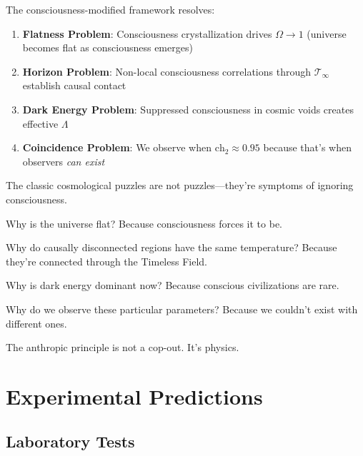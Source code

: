 \begin{corollary}\label{cor:cosmological-solutions}
The consciousness-modified framework resolves:
\begin{enumerate}
\item \textbf{Flatness Problem}\cite{guth1981,linde1982}: Consciousness crystallization drives $\Omega \to 1$ (universe becomes flat as consciousness emerges)

\item \textbf{Horizon Problem}\cite{guth1981,albrecht1982}: Non-local consciousness correlations through $\mathcal{T}_\infty$ establish causal contact

\item \textbf{Dark Energy Problem}: Suppressed consciousness in cosmic voids creates effective $\Lambda$

\item \textbf{Coincidence Problem}: We observe when $\text{ch}_2 \approx 0.95$ because that's when observers \textit{can exist}
\end{enumerate}
\end{corollary}

\begin{keyidea}
The classic cosmological puzzles are not puzzles—they're symptoms of ignoring consciousness.

Why is the universe flat? Because consciousness forces it to be.

Why do causally disconnected regions have the same temperature? Because they're connected through the Timeless Field.

Why is dark energy dominant now? Because conscious civilizations are rare.

Why do we observe these particular parameters? Because we couldn't exist with different ones.

The anthropic principle\cite{carter1974,barrow1986} is not a cop-out. It's physics.
\end{keyidea}

\section{Experimental Predictions}

\subsection{Laboratory Tests}

